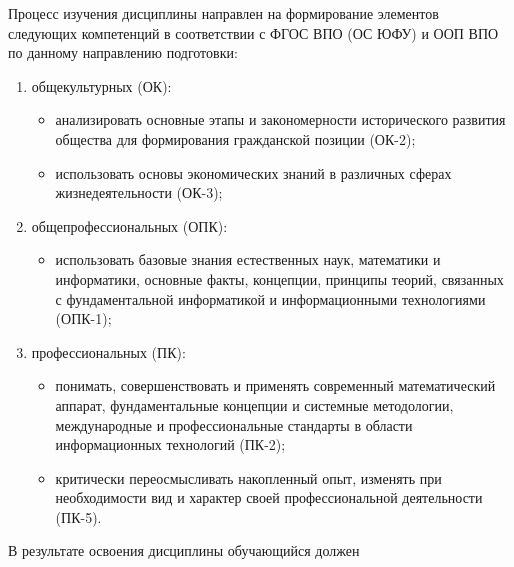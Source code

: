 	\ssect
Процесс изучения дисциплины направлен на формирование элементов следующих компетенций в соответствии с ФГОС ВПО (ОС ЮФУ) и ООП ВПО по данному направлению подготовки:
\begin{enumerate}
\rusitems %
	\item общекультурных (ОК):
	\begin{itemize}
		\item анализировать основные этапы и закономерности исторического развития общества для формирования гражданской позиции (ОК-2);
		\item использовать основы экономических знаний в различных сферах жизнедеятельности (ОК-3);
	\end{itemize}

	\item общепрофессиональных (ОПК):
	\begin{itemize}
		\item использовать базовые знания естественных наук, математики и информатики, основные факты, концепции, принципы теорий, связанных с фундаментальной информатикой и информационными технологиями (ОПК-1);
	\end{itemize}

	\item профессиональных (ПК):
	\begin{itemize}
		\item понимать, совершенствовать и применять современный математический аппарат, фундаментальные концепции и системные методологии, международные и профессиональные стандарты в области информационных технологий (ПК-2);
		\item критически переосмысливать накопленный опыт, изменять при необходимости вид и характер своей профессиональной деятельности (ПК-5).
	\end{itemize}
\end{enumerate}

В результате освоения дисциплины обучающийся должен

